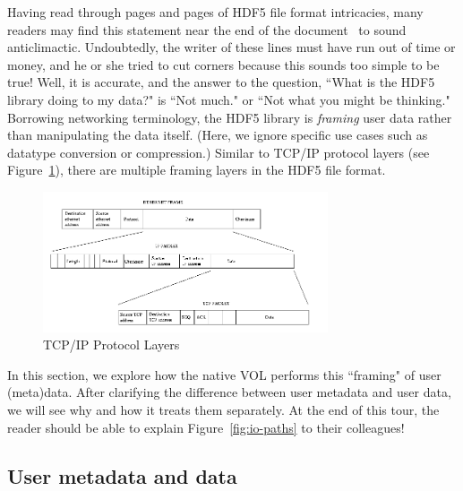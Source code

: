 Having read through pages and pages of HDF5 file format intricacies, many readers may find this statement near the end of the document~\cite{ffmt} to sound anticlimactic. Undoubtedly, the writer of these lines must have run out of time or money, and he or she tried to cut corners because this sounds too simple to be true! Well, it is accurate, and the answer to the question, ``What is the HDF5 library doing to my data?" is ``Not much." or ``Not what you might be thinking." Borrowing networking terminology, the HDF5 library is \textit{framing} user data rather than manipulating the data itself. (Here, we ignore specific use cases such as datatype conversion or compression.) Similar to TCP/IP protocol layers (see Figure~\ref{fig:tcpip-protocols}), there are multiple framing layers in the HDF5 file format.

\begin{figure}[h]
    \centering
    \includegraphics[width=0.75\textwidth]{images/protocols.png}
    \caption{TCP/IP Protocol Layers\cite{tldp2023}}
    \label{fig:tcpip-protocols}
\end{figure}

In this section, we explore how the native VOL performs this ``framing" of user (meta)data. After clarifying the difference between user metadata and user data, we will see why and how it treats them separately. At the end of this tour, the reader should be able to explain Figure~\ref{fig:io-paths} to their colleagues!

\subsection{User metadata and data}

